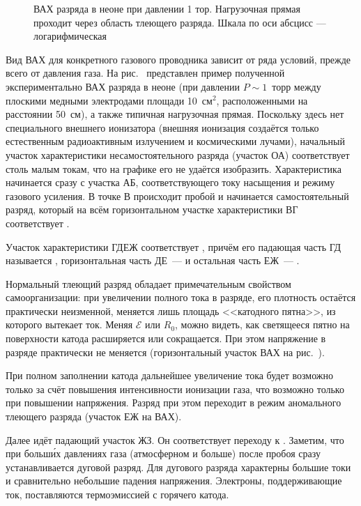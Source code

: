 \begin{figure}[h!]
    \centering
    \caption{ВАХ разряда в неоне при давлении 1 тор. Нагрузочная прямая проходит через область тлеющего разряда. Шкала по оси абсцисс --- логарифмическая}
\end{figure}

Вид ВАХ для конкретного газового проводника зависит от ряда условий, прежде
всего от давления газа. На рис.~ представлен пример
полученной экспериментально ВАХ разряда в неоне (при давлении $P\sim 1$~торр
между плоскими медными электродами площади 10~см$^2$, расположенными на
расстоянии 50~см), а также типичная нагрузочная прямая. Поскольку
здесь нет специального внешнего ионизатора (внешняя ионизация создаётся только
естественным радиоактивным излучением и космическими лучами), начальный участок
характеристики несамостоятельного разряда (участок ОА) соответствует столь
малым токам, что на графике его не удаётся изобразить. Характеристика
начинается сразу с участка АБ, соответствующего току насыщения и режиму
газового усиления. В точке В происходит пробой и начинается самостоятельный
разряд, который на всём горизонтальном участке характеристики ВГ соответствует
.

Участок характеристики ГДЕЖ соответствует ,
причём его падающая часть ГД называется ,
горизонтальная часть ДЕ~---  и
остальная часть ЕЖ~--- .

Нормальный тлеющий разряд обладает примечательным свойством самоорганизации:
при увеличении полного тока в разряде, его плотность остаётся практически
неизменной, меняется лишь площадь <<катодного пятна>>, из которого вытекает ток.
Меняя $\mathcal{E}$ или $R_0$, можно видеть, как светящееся пятно
на поверхности катода расширяется или сокращается.
При этом напряжение в разряде практически не меняется
(горизонтальный участок ВАХ на рис.~).

При полном заполнении катода дальнейшее увеличение тока будет возможно только за
счёт повышения интенсивности ионизации газа, что возможно только при повышении
напряжения. Разряд при этом переходит в режим аномального тлеющего разряда
(участок ЕЖ на ВАХ).

Далее идёт падающий участок ЖЗ. Он соответствует переходу к
. Заметим, что при больш\'{и}х давлениях газа
(атмосферном и больше) после пробоя сразу устанавливается дуговой разряд.
Для дугового разряда характерны большие токи и сравнительно небольшие падения
напряжения. Электроны, поддерживающие ток, поставляются термоэмиссией
с горячего катода.

